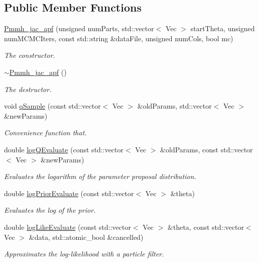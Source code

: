 \subsection*{Public Member Functions}
\begin{DoxyCompactItemize}
\item 
\hyperlink{classPmmh__jac__apf_ac195b6fc79a2d91620ceb077e752c4a8}{Pmmh\+\_\+jac\+\_\+apf} (unsigned num\+Parts, std\+::vector$<$ Vec $>$ start\+Theta, unsigned num\+M\+C\+M\+C\+Iters, const std\+::string \&data\+File, unsigned num\+Cols, bool mc)
\begin{DoxyCompactList}\small\item\em The constructor. \end{DoxyCompactList}\item 
\hyperlink{classPmmh__jac__apf_afbe2594fe7e40914ac4edc36580ebc33}{$\sim$\+Pmmh\+\_\+jac\+\_\+apf} ()\hypertarget{classPmmh__jac__apf_afbe2594fe7e40914ac4edc36580ebc33}{}\label{classPmmh__jac__apf_afbe2594fe7e40914ac4edc36580ebc33}

\begin{DoxyCompactList}\small\item\em The destructor. \end{DoxyCompactList}\item 
void \hyperlink{classPmmh__jac__apf_a0127e07b0f9ba6b042418c575b78ca55}{q\+Sample} (const std\+::vector$<$ Vec $>$ \&old\+Params, std\+::vector$<$ Vec $>$ \&new\+Params)
\begin{DoxyCompactList}\small\item\em Convenience function that. \end{DoxyCompactList}\item 
double \hyperlink{classPmmh__jac__apf_a17edc1dc687fb753eff22d5bb7e44964}{log\+Q\+Evaluate} (const std\+::vector$<$ Vec $>$ \&old\+Params, const std\+::vector$<$ Vec $>$ \&new\+Params)
\begin{DoxyCompactList}\small\item\em Evaluates the logarithm of the parameter proposal distribution. \end{DoxyCompactList}\item 
double \hyperlink{classPmmh__jac__apf_ab253d4b6c59a5e9529d042eb7b98dc8a}{log\+Prior\+Evaluate} (const std\+::vector$<$ Vec $>$ \&theta)
\begin{DoxyCompactList}\small\item\em Evaluates the log of the prior. \end{DoxyCompactList}\item 
double \hyperlink{classPmmh__jac__apf_acd0869e2b01566fcd45d85e850d4ee11}{log\+Like\+Evaluate} (const std\+::vector$<$ Vec $>$ \&theta, const std\+::vector$<$ Vec $>$ \&data, std\+::atomic\+\_\+bool \&cancelled)
\begin{DoxyCompactList}\small\item\em Approximates the log-\/likelihood with a particle filter. \end{DoxyCompactList}\end{DoxyCompactItemize}


